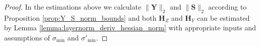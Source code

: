 \documentclass{article}
\begin{document}
\begin{proof}
In the estimations above we calculate $\| \mathbf{Y} \|_2$ and $\| \mathbf{S}\|_2$ according to Proposition \ref{prop:Y_S_norm_bounds} and both $\mathbf{H}_Z$ and $\mathbf{H}_Y$ can be estimated by Lemma \ref{lemma:layernorm_deriv_hessian_norm} with appropriate inputs and assumptions of $\sigma_{\min}$ and $\sigma'_{\min}$.
 
\end{proof}
\end{document}
